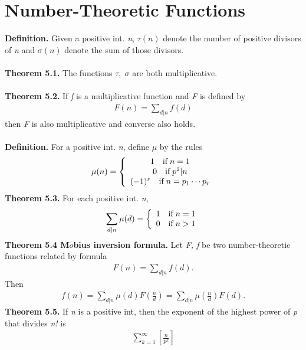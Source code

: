 \documentclass[a4paper,10pt]{article}
\begin{document}
\section{Number-Theoretic Functions}
\textbf{Definition.} Given a positive int. \textit{n}, \textit{$\tau(n)$} denote the number of positive divisors of \textit{n} and \textit{$\sigma(n)$} denote the sum of those divisors. \\ \\
\textbf{Theorem 5.1.} The functions \textit{$\tau, \; \sigma$} are both multiplicative. \\ \\
\textbf{Theorem 5.2.} If \textit{f} is a multiplicative function and \textit{F} is defined by
\begin{align}
F(n)=\sum_{d|n}{f(d)}
\end{align}
then \textit{F} is also multiplicative and converse also holds. \\ \\
\textbf{Definition.} For a positive int. \textit{n}, define \textit{$\mu$} by the rules
\begin{align}
\mu(n)=\left \{ \begin{array}{cc} 1 \quad \textnormal{if} \; n=1 \\ 0 \quad \textnormal{if} \; p^{2}|n \\ (-1)^{r} \quad \textnormal{if} \; n=p_{1}\cdots p_{r} \end{array} \right.
\end{align}
\textbf{Theorem 5.3.} For each positive int. \textit{n},
\begin{align}
\sum_{d|n}{\mu(d)}=\left \{ \begin{array}{cc} 1 \quad \textnormal{if} \; n=1 \\ 0 \quad \textnormal{if} \; n>1\end{array} \right.
\end{align}
\textbf{Theorem 5.4 M$\ddot{o}$bius inversion formula.} Let \textit{F, f} be two number-theoretic functions related by formula
\begin{align}
F(n)=\sum_{d|n}{f(d)}.
\end{align}
Then
\begin{align}
f(n)=\sum_{d|n}{\mu(d)F(\frac{n}{d})=\sum_{d|n}{\mu(\frac{n}{d})F(d)}}.
\end{align}
\textbf{Theorem 5.5.} If \textit{n} is a positive int,  then the exponent of the highest power of \textit{p} that divides \textit{n!} is
\begin{align}
\sum_{k=1}^{\infty}{[\frac{n}{p^{k}}]}
\end{align}
\end{document}
